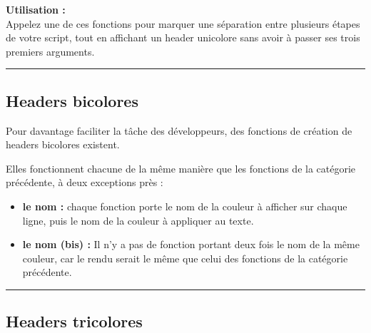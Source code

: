 \documentclass[a4paper,10pt]{article}
\begin{document}
\begin{justify}
    \textbf{Utilisation :}\\
    Appelez une de ces fonctions pour marquer une séparation entre plusieurs étapes de votre script, tout en affichant un header unicolore sans avoir à passer ses trois premiers arguments.
\end{justify}




\color{green}\par\noindent\rule{\textwidth}{0.4pt}\color{white}

\color{green}
\subsection{Headers bicolores}\color{white}

\begin{justify}
    Pour davantage faciliter la tâche des développeurs, des fonctions de création de headers bicolores existent.
\end{justify}

\begin{justify}
    Elles fonctionnent chacune de la même manière que les fonctions de la catégorie précédente, à deux exceptions près :

    \begin{itemize}
        \item \textbf{le nom :} chaque fonction porte le nom de la couleur à afficher sur chaque ligne, puis le nom de la couleur à appliquer au texte.\\

        \item \textbf{le nom (bis) :} Il n'y a pas de fonction portant deux fois le nom de la même couleur, car le rendu serait le même que celui des fonctions de la catégorie précédente.
    \end{itemize}
\end{justify}




\color{green}\par\noindent\rule{\textwidth}{0.4pt}\color{white}

\color{green}
\subsection{Headers tricolores}\color{white}
\end{document}
